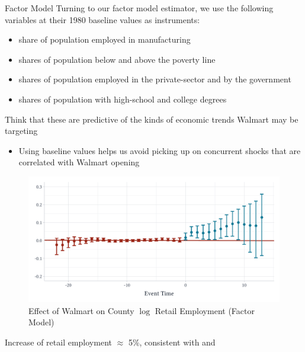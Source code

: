 \documentclass[aspectratio=169,t,11pt]{beamer}
\begin{document}
\begin{frame}{Factor Model}
  Turning to our factor model estimator, we use the following variables at their 1980 baseline values as instruments:
  \begin{itemize}
    \item share of population employed in manufacturing
    \item shares of population below and above the poverty line
    \item shares of population employed in the private-sector and by the government
    \item shares of population with high-school and college degrees
  \end{itemize}

  \smallskip\pause
  Think that these are predictive of the kinds of economic trends Walmart may be targeting
  \begin{itemize}
    \item Using baseline values helps us avoid picking up on concurrent shocks that are correlated with Walmart opening
  \end{itemize}
\end{frame}

\begin{frame}{}
  \vspace{-\bigskipamount}
  \begin{figure}
    \caption{Effect of Walmart on County $\log$ Retail Employment (Factor Model)}
    \begin{adjustbox}{width=0.85\textwidth}
      \includegraphics{../figures/qld_retail.pdf}
    \end{adjustbox}
  \end{figure}

  Increase of retail employment $\approx$ 5\%, consistent with  and 
\end{frame}
\end{document}
